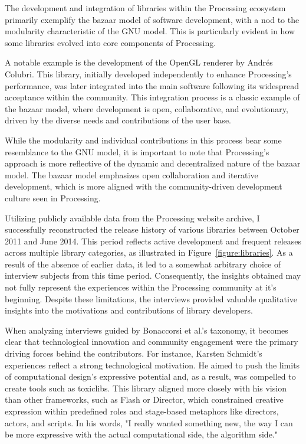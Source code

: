 The development and integration of libraries within the Processing ecosystem primarily exemplify the bazaar model of software development, with a nod to the modularity characteristic of the GNU model. This is particularly evident in how some libraries evolved into core components of Processing.

A notable example is the development of the OpenGL renderer by Andrés Colubri. This library, initially developed independently to enhance Processing's performance, was later integrated into the main software following its widespread acceptance within the community. This integration process is a classic example of the bazaar model, where development is open, collaborative, and evolutionary, driven by the diverse needs and contributions of the user base. \parencite{Processing4CONTRIBUTINGMd}

While the modularity and individual contributions in this process bear some resemblance to the GNU model, it is important to note that Processing's approach is more reflective of the dynamic and decentralized nature of the bazaar model. The bazaar model emphasizes open collaboration and iterative development, which is more aligned with the community-driven development culture seen in Processing.

Utilizing publicly available data from the Processing website archive, I successfully reconstructed the release history of various libraries between October 2011 and June 2014. This period reflects active development and frequent releases across multiple library categories, as illustrated in Figure~\ref*{figure:libraries}. As a result of the absence of earlier data, it led to a somewhat arbitrary choice of interview subjects from this time period. Consequently, the insights obtained may not fully represent the experiences within the Processing community at it's beginning. Despite these limitations, the interviews provided valuable qualitative insights into the motivations and contributions of library developers. 




When analyzing interviews guided by Bonaccorsi et al.'s taxonomy, it becomes clear that technological innovation and community engagement were the primary driving forces behind the contributors. For instance, Karsten Schmidt's experiences reflect a strong technological motivation. He aimed to push the limits of computational design's expressive potential and, as a result, was compelled to create tools such as toxiclibs. This library aligned more closely with his vision than other frameworks, such as Flash or Director, which constrained creative expression within predefined roles and stage-based metaphors like directors, actors, and scripts. In his words, "I really wanted something new, the way I can be more expressive with the actual computational side, the algorithm side."

